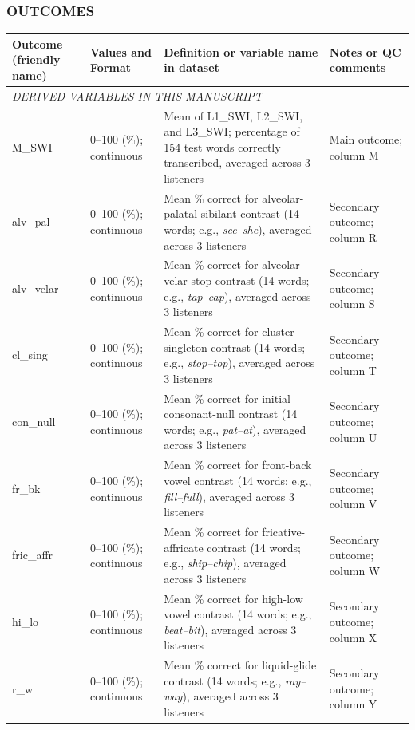 \documentclass{article}
\begin{document}
\subsubsection*{OUTCOMES}
\begin{longtable}{p{2cm} p{2cm} p{5cm} p{5cm}}
\toprule
\textbf{Outcome (friendly name)} & \textbf{Values and Format} & \textbf{Definition or variable name in dataset} & \textbf{Notes or QC comments} \\
\midrule
\multicolumn{4}{l}{\textit{DERIVED VARIABLES IN THIS MANUSCRIPT}} \\[0.5em]
M\_SWI & 0--100 (\%); continuous & Mean of L1\_SWI, L2\_SWI, and L3\_SWI; percentage of 154 test words correctly transcribed, averaged across 3 listeners & Main outcome; column M \\[1em]
alv\_pal & 0--100 (\%); continuous & Mean \% correct for alveolar-palatal sibilant contrast (14 words; e.g., \textit{see--she}), averaged across 3 listeners & Secondary outcome; column R \\[1em]
alv\_velar & 0--100 (\%); continuous & Mean \% correct for alveolar-velar stop contrast (14 words; e.g., \textit{tap--cap}), averaged across 3 listeners & Secondary outcome; column S \\[1em]
cl\_sing & 0--100 (\%); continuous & Mean \% correct for cluster-singleton contrast (14 words; e.g., \textit{stop--top}), averaged across 3 listeners & Secondary outcome; column T \\[1em]
con\_null & 0--100 (\%); continuous & Mean \% correct for initial consonant-null contrast (14 words; e.g., \textit{pat--at}), averaged across 3 listeners & Secondary outcome; column U \\[1em]
fr\_bk & 0--100 (\%); continuous & Mean \% correct for front-back vowel contrast (14 words; e.g., \textit{fill--full}), averaged across 3 listeners & Secondary outcome; column V \\[1em]
fric\_affr & 0--100 (\%); continuous & Mean \% correct for fricative-affricate contrast (14 words; e.g., \textit{ship--chip}), averaged across 3 listeners & Secondary outcome; column W \\[1em]
hi\_lo & 0--100 (\%); continuous & Mean \% correct for high-low vowel contrast (14 words; e.g., \textit{beat--bit}), averaged across 3 listeners & Secondary outcome; column X \\[1em]
r\_w & 0--100 (\%); continuous & Mean \% correct for liquid-glide contrast (14 words; e.g., \textit{ray--way}), averaged across 3 listeners & Secondary outcome; column Y \\[1em]

\end{longtable}
\end{document}
